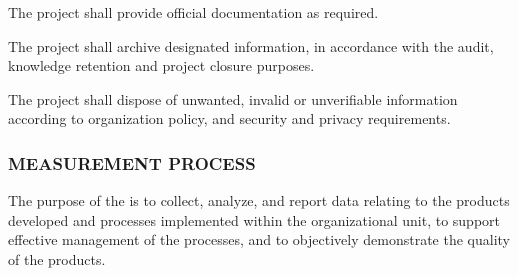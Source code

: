 \begin{adjustwidth}{2em}{0pt}
\begin{compactenum}
\begin{compactenum}
						\item The project shall provide official documentation as required.

						\item The project shall archive designated information, in accordance with the audit, knowledge retention and project closure purposes.

						\item The project shall dispose of unwanted, invalid or unverifiable information according to organization policy, and security and privacy requirements.

					\end{compactenum}

				\end{compactenum}

			\end{adjustwidth}

		\newpage
		\subsubsection{MEASUREMENT PROCESS\label{proc:measurement_process}}

			\begin{adjustwidth}{2em}{0pt} 

				The purpose of the  is to collect, analyze, and report data relating to the products developed and processes implemented within the organizational unit, to support effective management of the processes, and to objectively demonstrate the quality of the products.

			\end{adjustwidth}

